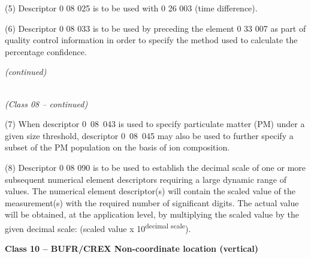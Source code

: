 (5) Descriptor 0 08 025 is to be used with 0 26 003 (time difference).

(6) Descriptor 0 08 033 is to be used by preceding the element 0 33 007 as part of quality control information in order to specify the method used to calculate the percentage confidence.

\emph{(continued)}

\emph{\\
(Class 08 -- continued)}

(7) When descriptor 0~08~043 is used to specify particulate matter (PM) under a given size threshold, descriptor 0~08~045 may also be used to further specify a subset of the PM population on the basis of ion composition.

(8) Descriptor 0 08 090 is to be used to establish the decimal scale of one or more subsequent numerical element descriptors requiring a large dynamic range of values. The numerical element descriptor(s) will contain the scaled value of the measurement(s) with the required number of significant digits. The actual value will be obtained, at the application level, by multiplying the scaled value by the given decimal scale: (scaled value x 10\textsuperscript{decimal scale}).

\textbf{Class 10 -- BUFR/CREX Non-coordinate location (vertical)}

